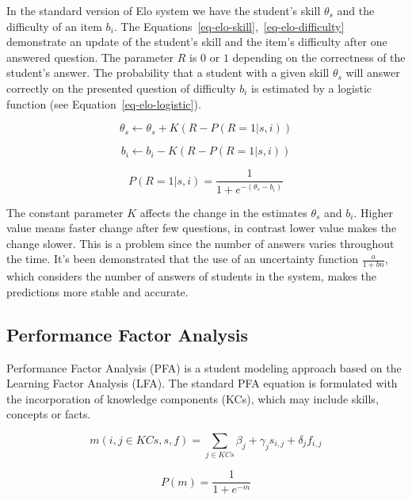 In the standard version of Elo system we have the student's skill $\theta_s$ and the difficulty of an item $b_i$. The Equations~\ref{eq-elo-skill},~\ref{eq-elo-difficulty} demonstrate an update of the student's skill and the item's difficulty after one answered question. The parameter $R$ is $0$ or $1$ depending on the correctness of the student's answer. The probability that a student with a given skill $\theta_s$ will answer correctly on the presented question of difficulty $b_i$ is estimated by a logistic function (see Equation~\ref{eq-elo-logistic}).

\begin{equation} \label{eq-elo-skill}
  \theta_s \gets \theta_s + K(R - P(R = 1|s,i))
\end{equation}

\begin{equation} \label{eq-elo-difficulty}
  b_i \gets b_i - K(R - P(R = 1|s,i))
\end{equation}

\begin{equation} \label{eq-elo-logistic}
  P(R = 1|s,i) = \frac{1}{1 + e^{-(\theta_s - b_i)}}
\end{equation}

The constant parameter $K$ affects the change in the estimates $\theta_s$ and $b_i$. Higher value means faster change after few questions, in contrast lower value makes the change slower. This is a problem since the number of answers varies throughout the time. It's been demonstrated that the use of an uncertainty function $\frac{a}{1 + bn}$, which considers the number of answers of students in the system, makes the predictions more stable and accurate.

\subsection{Performance Factor Analysis}
\label{pfa}

Performance Factor Analysis (PFA) is a student modeling approach based on the Learning Factor Analysis (LFA). The standard PFA equation is formulated with the incorporation of knowledge components (KCs), which may include skills, concepts or facts.

\begin{equation} \label{eq-pfa-standard}
  m(i,j \in KCs,s,f) = \sum_{j \in KCs} \beta_j + \gamma_j s_{i,j} + \delta_j f_{i,j} 
\end{equation}

\begin{equation} \label{eq-pfa-standard-p}
  P(m) = \frac{1}{1 + e^{-m}}
\end{equation}

